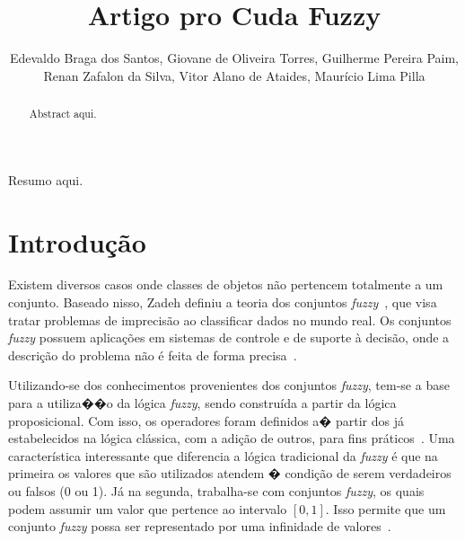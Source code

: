 \documentclass[12pt]{article}
\title{Artigo pro Cuda Fuzzy}
\author{Edevaldo Braga dos Santos\inst{1}, Giovane de Oliveira Torres\inst{1}, Guilherme Pereira Paim\inst{1},\\ Renan Zafalon da Silva\inst{1}, Vitor Alano de Ataides\inst{1}, Maurício Lima Pilla\inst{1}}
\begin{document}
\newcommand{\libname}{CudaFuzzy}

\maketitle

\begin{abstract}

Abstract aqui.

\end{abstract}

\begin{resumo}

Resumo aqui.

\end{resumo}

\section{Introdução}
\label{sec:introducao}


	Existem diversos casos onde classes de objetos não pertencem totalmente a um conjunto. Baseado nisso, Zadeh definiu a teoria dos conjuntos \textit{fuzzy}~\cite{zadeh:65}, que visa tratar problemas de imprecisão ao classificar dados no mundo real. Os conjuntos \textit{fuzzy} possuem aplicações em sistemas de controle e de suporte à decisão, onde a descrição do problema não é feita de forma precisa~\cite{weber:03}.
	
	Utilizando-se dos conhecimentos provenientes dos conjuntos \textit{fuzzy}, tem-se a base para a utiliza��o da lógica \textit{fuzzy}, sendo construída a partir da lógica proposicional. Com isso, os operadores foram definidos a� partir dos já estabelecidos na lógica clássica, com a adição de outros, para fins práticos~\cite{tanscheit:04}. Uma característica interessante que diferencia a lógica tradicional da \textit{fuzzy} é que na primeira os valores que são utilizados atendem � condição de serem verdadeiros ou falsos (0 ou 1). Já na segunda, trabalha-se com conjuntos \textit{fuzzy}, os quais podem assumir um valor que pertence ao intervalo $[0, 1]$. Isso permite que um conjunto \textit{fuzzy} possa ser representado por uma infinidade de valores~\cite{klir:95}.	
	
\end{document}
